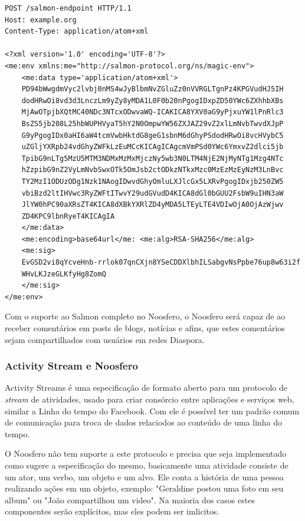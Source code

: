 \documentclass[12pt]{article}
\begin{document}
\begin{framed}
\begin{lstlisting}[caption=Exemplo requisição POST Salmon]
POST /salmon-endpoint HTTP/1.1
Host: example.org
Content-Type: application/atom+xml

<?xml version='1.0' encoding='UTF-8'?>
<me:env xmlns:me="http://salmon-protocol.org/ns/magic-env">
    <me:data type='application/atom+xml'>
    PD94bWwgdmVyc2lvbj0nMS4wJyBlbmNvZGluZz0nVVRGLTgnPz4KPGVudHJ5IH
    dodHRwOi8vd3d3LnczLm9yZy8yMDA1L0F0b20nPgogIDxpZD50YWc6ZXhhbXBs
    MjAwOTpjbXQtMC40NDc3NTcxODwvaWQ-ICAKICA8YXV0aG9yPjxuYW1lPnRlc3
    BsZS5jb208L25hbWUPHVyaT5hY2N0OmpwYW56ZXJAZ29vZ2xlLmNvbTwvdXJpP
    G9yPgogIDx0aHI6aW4tcmVwbHktdG8geG1sbnM6dGhyPSdodHRwOi8vcHVybC5
    uZGljYXRpb24vdGhyZWFkLzEuMCcKICAgICAgcmVmPSd0YWc6YmxvZ2dlci5jb
    TpibG9nLTg5MzU5MTM3NDMxMzMxMjczNy5wb3N0LTM4NjE2NjMyNTg1Mzg4NTc
    hZzpibG9nZ2VyLmNvbSwxOTk5OmJsb2ctODkzNTkxMzc0MzEzMzEyNzM3LnBvc
    TY2MzI1ODUzODg1Nzk1NAogIDwvdGhyOmluLXJlcGx5LXRvPgogIDxjb250ZW5
    vbiBzd2ltIHVwc3RyZWFtITwvY29udGVudD4KICA8dGl0bGUU2FsbW9uIHN3aW
    JlYW0hPC90aXRsZT4KICA8dXBkYXRlZD4yMDA5LTEyLTE4VDIwOjA0OjAzWjwv
    ZD4KPC9lbnRyeT4KICAgIA
    </me:data>
    <me:encoding>base64url</me: <me:alg>RSA-SHA256</me:alg>
    <me:sig>
    EvGSD2vi8qYcveHnb-rrlok07qnCXjn8YSeCDDXlbhILSabgvNsPpbe76up8w63i2f
    WHvLKJzeGLKfyHg8ZomQ
    </me:sig>
</me:env>
\end{lstlisting}
\end{framed}

Com o suporte ao Salmon completo no Noosfero, o Noosfero será capaz de ao
receber comentários em posts de blogs, notícias e afins, que estes comentários
sejam compartilhados com usuários em redes Diaspora.

\subsubsection{Activity Stream e Noosfero}

Activity Streams é uma especificação de formato aberto para um protocolo de
{\it stream} de atividades, usado para criar consórcio entre aplicações e
serviços web, similar a Linha do tempo do Facebook. Com ele é possível ter um
padrão comum de comunicação para troca de dados relaciodos ao conteúdo de uma
linha do tempo.

O Noosfero não tem suporte a este protocolo e precisa que seja implementado
como sugere a especificação do mesmo, basicamente uma atividade consiste de um
ator, um verbo, um objeto e um alvo. Ele conta a história de uma pessoa
realizando ações em um objeto, exemplo: "Geraldine postou uma foto em seu
album" ou "João compartilhou um video"\cite{streams}. Na maioria dos casos
estes componentes serão explícitos, mas eles podem ser imlicitos.
\end{document}

